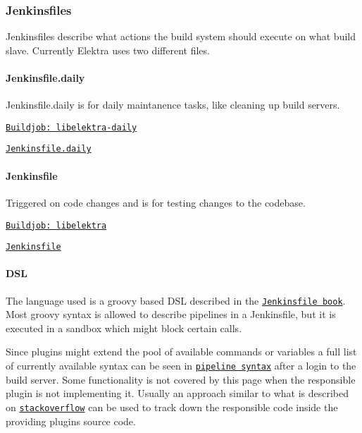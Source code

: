 \subsubsection*{Jenkinsfiles}

Jenkinsfiles describe what actions the build system should execute on what build slave. Currently Elektra uses two different files.

\paragraph*{Jenkinsfile.\+daily}


\begin{DoxyItemize}
\item Jenkinsfile.\+daily is for daily maintanence tasks, like cleaning up build servers.
\item \href{https://build.libelektra.org/jenkins/job/libelektra-daily/}{\tt Buildjob\+: libelektra-\/daily}
\item \href{https://master.libelektra.org/scripts/jenkins/Jenkinsfile.daily}{\tt Jenkinsfile.\+daily}
\end{DoxyItemize}

\paragraph*{Jenkinsfile}


\begin{DoxyItemize}
\item Triggered on code changes and is for testing changes to the codebase.
\item \href{https://build.libelektra.org/jenkins/job/libelektra/}{\tt Buildjob\+: libelektra}
\item \href{https://master.libelektra.org/scripts/jenkins/Jenkinsfile}{\tt Jenkinsfile}
\end{DoxyItemize}

\paragraph*{D\+SL}

The language used is a groovy based D\+SL described in the \href{https://jenkins.io/doc/book/pipeline/jenkinsfile/}{\tt Jenkinsfile book}. Most groovy syntax is allowed to describe pipelines in a Jenkinsfile, but it is executed in a sandbox which might block certain calls.

Since plugins might extend the pool of available commands or variables a full list of currently available syntax can be seen in \href{https://build.libelektra.org/jenkins/job/libelektra/pipeline-syntax/}{\tt pipeline syntax} after a login to the build server. Some functionality is not covered by this page when the responsible plugin is not implementing it. Usually an approach similar to what is described on \href{https://stackoverflow.com/questions/51103359/jenkins-pipeline-return-value-of-build-step}{\tt stackoverflow} can be used to track down the responsible code inside the providing plugins source code.

